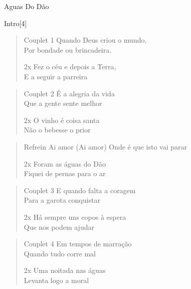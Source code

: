 \begin{song}[huayno]{Aguas Do Dão}
\begin{instrumental}{Intro}[4]
 \measure{} 
   
\end{instrumental}

\begin{verse}{Couplet 1}
Quando Deus criou o mundo,\\ 		         
Por bondade ou brincadeira.\\
\begin{sidenote}{2x}
Fez o céu e depois a Terra,\\ 
E a seguir a parreira
\end{sidenote}
\end{verse}

\begin{verse}{Couplet 2}
É a alegria da vida\\ 		        
Que a gente sente melhor\\  
\begin{sidenote}{2x}         
O vinho é coisa santa\\
Não o bebesse o prior
\end{sidenote}
\end{verse}

\begin{verse}{Refrein}
Ai amor (Ai amor) Onde é que isto vai parar \\
\begin{sidenote}{2x}
Foram as águas do Dão\\
Fiquei de pernas para o ar
\end{sidenote}
\end{verse}


\begin{verse}{Couplet 3}
E quando falta a coragem\\ 
Para a garota conquistar \\
\begin{sidenote}{2x}
Há sempre uns copos à espera\\ 
Que nos podem ajudar
\end{sidenote}
\end{verse}

\begin{verse}{Couplet 4}
Em tempos de marração\\ 
Quando tudo corre mal \\
\begin{sidenote}{2x}
Uma noitada nas águas \\
Levanta logo a moral
\end{sidenote}
\end{verse}

\end{song}
\clearpage

